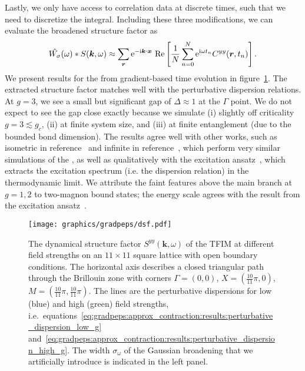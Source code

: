 Lastly, we only have access to correlation data at discrete times, such that we need to discretize the integral.
%
Including these three modifications, we can evaluate the broadened structure factor as
\begin{equation}
    \hat{W_\sigma}(\omega) * S(\vec{k},\omega)
    \approx \sum_{\vec{r}} \eto{-\im\vec{k}\cdot\vec{x}} ~ \mathrm{Re}\sBr{\frac{1}{N}\sum_{n=0}^N \eto{\im\omega t_n} C^{yy}(\vec{r}, t_n)}
    .
\end{equation}
%
We present results for the  from gradient-based time evolution in figure~\ref{fig:gradpeps:dsf}.
%
The extracted structure factor matches well with the perturbative dispersion relations.
%
At $g=3$, we see a small but significant gap of $\Delta \approx 1$ at the $\Gamma$ point.
%
We do not expect to see the gap close exactly because we simulate (i) slightly off criticality $g = 3 \lesssim g_c$, (ii) at finite system size, and (iii) at finite entanglement (due to the bounded bond dimension).
%
The results agree well with other works, such as isometric  in reference\ \cite{lin2022} and infinite  in reference~\cite{espinoza2024}, which perform very similar simulations of the , as well as qualitatively with the  excitation ansatz~\cite{vanderstraeten2019, ponsioen2020}, which extracts the excitation spectrum (i.e. the dispersion relation) in the thermodynamic limit.
%
We attribute the faint features above the main branch at $g=1,2$ to two-magnon bound states; the energy scale agrees with the result from the excitation ansatz\ \cite{ponsioen2020}.


\begin{figure}
    \centering
    \texttt{[image: graphics/gradpeps/dsf.pdf]}
    \caption[
        Dynamical structure factor of the TFIM.
    ]{
        The dynamical structure factor $S^{yy}(\mathbf{k}, \omega)$ of the TFIM at different field strengths on an $11\times 11$ square lattice with open boundary conditions.
	The horizontal axis describes a closed triangular path through the Brillouin zone with corners $\Gamma = (0,0)$, $X = (\tfrac{10}{11}\pi, 0)$, $M = (\tfrac{10}{11}\pi, \tfrac{10}{11}\pi)$.
	The lines are the perturbative dispersions for low (blue) and high (green) field strengths, i.e.\ equations\ \eqref{eq:gradpeps:approx_contraction:results:perturbative_dispersion_low_g} and\ \eqref{eq:gradpeps:approx_contraction:results:perturbative_dispersion_high_g}.
	The width $\sigma_\omega$ of the Gaussian broadening that we artificially introduce is indicated in the left panel.
    }
    \label{fig:gradpeps:dsf}
\end{figure}


